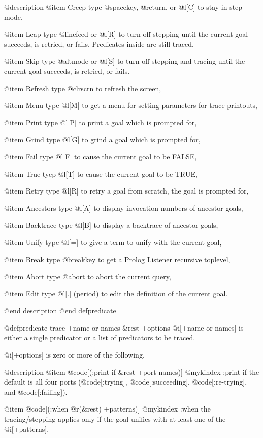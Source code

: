 {@description
@item Creep
type @spacekey, @return, or @l[C] to stay in step mode,

@item Leap
type @linefeed or @l[R] to turn off stepping until the current goal
succeeds, is retried, or fails.  Predicates inside are still traced.

@item Skip
type @altmode or @l[S] to turn off stepping and tracing until the current goal
succeeds, is retried, or fails.  

@item Refresh
type @clrscrn to refresh the screen,

@item Menu
type @l[M] to get a menu for setting parameters for trace printouts,

@item Print
type @l[P] to print a goal which is prompted for,

@item Grind
type @l[G] to grind a goal which is prompted for,

@item Fail
type @l[F] to cause the current goal to be FALSE,

@item True
tyep @l[T] to cause the current goal to be TRUE,

@item Retry
type @l[R] to retry a goal from scratch, the goal is prompted for,

@item Ancestors
type @l[A] to display invocation numbers of ancestor goals,

@item Backtrace
type @l[B] to display a backtrace of ancestor goals,

@item Unify
type @l[=] to give a term to unify with the current goal,

@item Break
type @breakkey to get a Prolog Listener recursive toplevel,

@item Abort
type @abort to abort the current query,

@item Edit
type @l[.] (period) to edit the definition of the current goal.

@end description
@end defpredicate

@defpredicate trace +name-or-names &rest +options
@i[+name-or-names] is either a single predicator or a list of predicators
to be traced.

@i[+options] is zero or more of the following.

@description
@item @code[(:print-if &rest +port-names)]
@mykindex :print-if
the default is all four ports 
(@code[:trying], @code[:succeeding], @code[:re-trying], and @code[:failing]). 

@item @code[(:when @r(&rest) +patterns)]
@mykindex :when
the tracing/stepping applies only if the goal unifies with at least 
one of the @i[+patterns].

}
